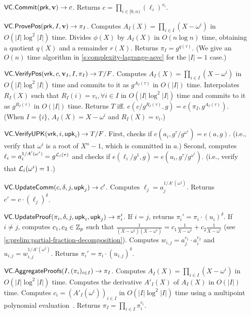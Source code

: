 \api $\mathsf{VC}.\mathsf{Commit}(\mathsf{prk}, \bm{\mathrm{v}}) \rightarrow c$.
Returns $c=\prod_{i\in[0,n)} (\ell_i)^{v_i}$.

\api $\mathsf{VC}.\mathsf{ProvePos}(\mathsf{prk}, I, \bm{\mathrm{v}}) \rightarrow \pi_I$.
Computes $A_I(X)=\prod_{i\in I} (X-\omega^i)$ in $O(\vert I\vert \log^2{\vert I \vert})$ time.
Divides $\phi(X)$ by $A_I(X)$ in $O(n\log{n})$ time, obtaining a quotient $q(X)$ and a remainder $r(X)$.
Returns $\pi_I = g^{q(\tau)}$.
(We give an $O(n)$ time algorithm in \cref{s:complexity-lagrange-asvc} for the $\vert I\vert = 1$ case.)

\api $\mathsf{VC}.\mathsf{VerifyPos}(\mathsf{vrk}, c, \bm{\mathrm{v}}_I, I, \pi_I) \rightarrow T/F$.
Computes $A_I(X)=\prod_{i\in I} (X-\omega^i)$ in $O(\vert I\vert \log^2{\vert I \vert})$ time and commits to it as $g^{A_I(\tau)}$ in $O(\vert I \vert)$ time.
Interpolates $R_I(X)$ such that $R_I(i) = v_i,\forall i \in I$ in $O(\vert I\vert \log^2{\vert I \vert})$ time and commits to it as $g^{R_I(\tau)}$ in $O(\vert I \vert)$ time.
Returns $T$ iff. $e(c/g^{R_I(\tau)},g)=e(\pi_I, g^{A_I(\tau)})$.
(When $I=\{i\}$, $A_I(X)=X-\omega^i$ and $R_I(X)=v_i$.)

\api $\mathsf{VC}.\mathsf{VerifyUPK}(\mathsf{vrk},i, \mathsf{upk}_i) \rightarrow T/F$.
First, checks if $e(a_i, g^\tau/g^{\omega^i}) = e(a,g)$.
(i.e., verify that $\omega^i$ is a root of $X^n-1$, which is committed in $a$.)
Second, computes $\ell_i=a_i^{1/A'(\omega^i)}=g^{\mathcal{L}_i(\tau)}$ and checks if $e(\ell_i/g^1, g) =e(u_i,g^\tau/g^{\omega^i})$.
(i.e., verify that $\mathcal{L}_i(\omega^i) = 1$.)

\api $\mathsf{VC}.\mathsf{UpdateComm}(c, \delta, j,\mathsf{upk}_j)\rightarrow c'$.
Computes $\ell_j=a_j^{1/A'(\omega^j)}$.
Returns $c'=c\cdot (\ell_j)^\delta$.

\api $\mathsf{VC}.\mathsf{UpdateProof}(\pi_i, \delta, j, \mathsf{upk}_i, \mathsf{upk}_j)\rightarrow \pi'_i$.
If $i=j$, returns $\pi_i'=\pi_i \cdot (u_i)^\delta$.
If $i\ne j$, computes $c_1,c_2\in \mathbb{Z}_p$ such that $\frac{1}{(X-\omega^j)(X-\omega^i)} = c_1 \frac{1}{X-\omega^j} + c_2\frac{1}{X-\omega^i}$ (see \cref{s:prelim:partial-fraction-decomposition}).
Computes $w_{i,j}=a_j^{c_1}\cdot a_i^{c_2}$ and $u_{i,j}=w_{i,j}^{1/A'(\omega^j)}$.
Returns $\pi_i'=\pi_i \cdot (u_{i,j})^\delta$.

\api $\mathsf{VC}.\mathsf{AggregateProofs}(I, (\pi_i)_{i\in I})\rightarrow \pi_I$.
Computes $A_I(X)=\prod_{i\in I} (X-\omega^i)$ in $O(\vert I\vert \log^2{\vert I \vert})$ time.
Computes the derivative $A'_I(X)$ of $A_I(X)$ in $O(\vert I\vert)$ time.
Computes $c_i = (A'_I(\omega^i))_{i\in I}$ in $O(\vert I\vert \log^2{\vert I \vert})$ time using a multipoint polynomial evaluation~\cite{vG13ModernCh10}.
Returns $\pi_I = \prod_{i\in I} \pi_i^{c_i}$.

